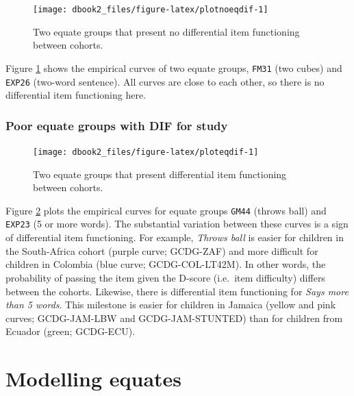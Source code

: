\documentclass[
]{book}
\begin{document}
\begin{figure}

{\centering \texttt{[image: dbook2\_files/figure-latex/plotnoeqdif-1]} 

}

\caption{Two equate groups that present no differential item functioning between cohorts.}\label{fig:plotnoeqdif}
\end{figure}



Figure \ref{fig:plotnoeqdif} shows the empirical curves of two equate groups, \texttt{FM31} (two cubes) and \texttt{EXP26} (two-word sentence). All curves are close to each other, so there is no differential item functioning here.

\hypertarget{poor-equate-groups-with-dif-for-study}{%
\subsection{Poor equate groups with DIF for study}\label{poor-equate-groups-with-dif-for-study}}

\begin{figure}

{\centering \texttt{[image: dbook2\_files/figure-latex/ploteqdif-1]} 

}

\caption{Two equate groups that present differential item functioning between cohorts.}\label{fig:ploteqdif}
\end{figure}



Figure \ref{fig:ploteqdif} plots the empirical curves for equate groups \texttt{GM44} (throws ball) and \texttt{EXP23} (5 or more words). The substantial variation between these curves is a sign of differential item functioning. For example, \emph{Throws ball} is easier for children in the South-Africa cohort (purple curve; GCDG-ZAF) and more difficult for children in Colombia (blue curve; GCDG-COL-LT42M). In other words, the probability of passing the item given the D-score (i.e.~item difficulty) differs between the cohorts. Likewise, there is differential item functioning for \emph{Says more than 5 words}. This milestone is easier for children in Jamaica (yellow and pink curves; GCDG-JAM-LBW and GCDG-JAM-STUNTED) than for children from Ecuador (green; GCDG-ECU).

\newpage

\hypertarget{ch:modellingequates}{%
\chapter{Modelling equates}\label{ch:modellingequates}}
\end{document}
